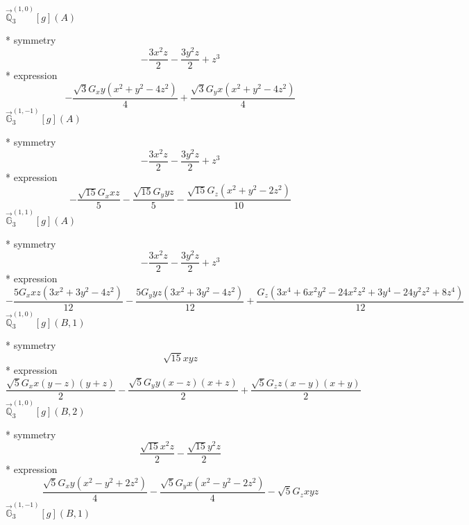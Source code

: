 \documentclass[fleqn,8pt]{jsarticle}
\begin{document}
\noindent\quad $\vec{\mathbb{Q}}_{3}^{(1,0)}[g](A)$

\noindent\quad ** symmetry
\begin{dmath*}
- \frac{3 x^{2} z}{2} - \frac{3 y^{2} z}{2} + z^{3}
\end{dmath*}
\noindent\quad ** expression
\begin{dmath*}
- \frac{\sqrt{3} G_{x} y \left(x^{2} + y^{2} - 4 z^{2}\right)}{4} + \frac{\sqrt{3} G_{y} x \left(x^{2} + y^{2} - 4 z^{2}\right)}{4}
\end{dmath*}
\noindent\quad $\vec{\mathbb{G}}_{3}^{(1,-1)}[g](A)$

\noindent\quad ** symmetry
\begin{dmath*}
- \frac{3 x^{2} z}{2} - \frac{3 y^{2} z}{2} + z^{3}
\end{dmath*}
\noindent\quad ** expression
\begin{dmath*}
- \frac{\sqrt{15} G_{x} x z}{5} - \frac{\sqrt{15} G_{y} y z}{5} - \frac{\sqrt{15} G_{z} \left(x^{2} + y^{2} - 2 z^{2}\right)}{10}
\end{dmath*}
\noindent\quad $\vec{\mathbb{G}}_{3}^{(1,1)}[g](A)$

\noindent\quad ** symmetry
\begin{dmath*}
- \frac{3 x^{2} z}{2} - \frac{3 y^{2} z}{2} + z^{3}
\end{dmath*}
\noindent\quad ** expression
\begin{dmath*}
- \frac{5 G_{x} x z \left(3 x^{2} + 3 y^{2} - 4 z^{2}\right)}{12} - \frac{5 G_{y} y z \left(3 x^{2} + 3 y^{2} - 4 z^{2}\right)}{12} + \frac{G_{z} \left(3 x^{4} + 6 x^{2} y^{2} - 24 x^{2} z^{2} + 3 y^{4} - 24 y^{2} z^{2} + 8 z^{4}\right)}{12}
\end{dmath*}
\noindent\quad $\vec{\mathbb{Q}}_{3}^{(1,0)}[g](B,1)$

\noindent\quad ** symmetry
\begin{dmath*}
\sqrt{15} x y z
\end{dmath*}
\noindent\quad ** expression
\begin{dmath*}
\frac{\sqrt{5} G_{x} x \left(y - z\right) \left(y + z\right)}{2} - \frac{\sqrt{5} G_{y} y \left(x - z\right) \left(x + z\right)}{2} + \frac{\sqrt{5} G_{z} z \left(x - y\right) \left(x + y\right)}{2}
\end{dmath*}
\noindent\quad $\vec{\mathbb{Q}}_{3}^{(1,0)}[g](B,2)$

\noindent\quad ** symmetry
\begin{dmath*}
\frac{\sqrt{15} x^{2} z}{2} - \frac{\sqrt{15} y^{2} z}{2}
\end{dmath*}
\noindent\quad ** expression
\begin{dmath*}
\frac{\sqrt{5} G_{x} y \left(x^{2} - y^{2} + 2 z^{2}\right)}{4} - \frac{\sqrt{5} G_{y} x \left(x^{2} - y^{2} - 2 z^{2}\right)}{4} - \sqrt{5} G_{z} x y z
\end{dmath*}
\noindent\quad $\vec{\mathbb{G}}_{3}^{(1,-1)}[g](B,1)$
\end{document}

